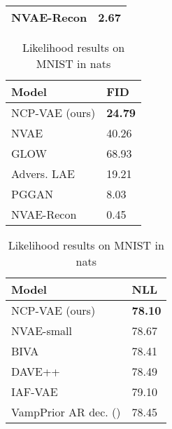 \documentclass{article} \usepackage{iclr2021_conference,times}
\begin{document}
\begin{table}[t]
\begin{minipage}{.49\linewidth}
\begin{tabular}{ll}
\hline
NVAE-{\color{blue}Recon} \citep{vahdat2020NVAE} & 2.67\\
\bottomrule
 \end{tabular}
\end{minipage}
\end{table} \begin{table}[t]
\small
\begin{minipage}{.49\linewidth}
    \centering
\caption{Generative performance on CelebA-HQ-256}
\label{tab:table celeba 256}
   \begin{tabular}{ll}
      Model & FID \\
      \midrule
      NCP-VAE (ours) & \bf 24.79\\
      NVAE \citep{vahdat2020NVAE} & 40.26\\
      \hline
      GLOW \citep{kingma2018glow} & 68.93\\
      \hline
      \hline
      Advers. LAE \citep{pidhorskyi2020adversarial} & 19.21\\
      PGGAN \citep{karras2017progressive} & 8.03 \\
      \hline
      NVAE-{\color{blue}Recon} \citep{vahdat2020NVAE} & 0.45\\
\bottomrule
\end{tabular}
\end{minipage}\hfill
\begin{minipage}{.5\linewidth}
    \centering
\caption{Likelihood results on MNIST in nats}
\label{tab:table mnist}
   \begin{tabular}{ll}
      Model & NLL \\
      \midrule
      NCP-VAE (ours) & \bf 78.10\\
      NVAE-small \citep{vahdat2020NVAE}    & 78.67\\
      \hline
BIVA \citep{maaloe2019biva} & 78.41 \\
      DAVE++ \citep{Vahdat2018DVAE++} & 78.49 \\
      IAF-VAE \citep{kingma2016improved} & 79.10 \\
      VampPrior AR dec. (\citeauthor{tomczak2018VampPrior}) & 78.45 \\
\bottomrule
\end{tabular}
\end{minipage}
\end{table}










 \vspace{-0.2cm}
\end{document}

